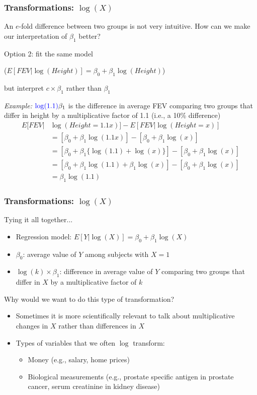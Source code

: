 \documentclass[12pt, 
hyperref={colorlinks=true, linkcolor=blue, urlcolor=cyan},dvipsnames]{beamer}
\begin{document}
\begin{frame}
\frametitle{Transformations: $\log(X)$}
An $e$-fold difference between two groups is not very intuitive. How can we make our interpretation of $\beta_1$ better?

Option 2: fit the same model \begin{scriptsize}($E[FEV|\log(Height)] = \beta_0 + \beta_1\log(Height)$)\end{scriptsize} but interpret $c \times \beta_1$ rather than $\beta_1$ \pause

\textit{Example:} $\color{blue}\log(1.1)\color{black}\beta_1$ is the difference in average FEV comparing two groups that differ in height by a \color{blue}multiplicative factor of 1.1 \color{black} (i.e., a 10\% difference)\pause
	\begin{align*}
	E[FEV|&\log(Height=1.1x)]-E[FEV|\log(Height=x)] \\
	& = \left[\beta_0 + \beta_1\log(1.1x)\right] - \left[\beta_0 + \beta_1 \log(x) \right]\\
	& = \left[\beta_0 + \beta_1\{\log(1.1)+\log(x)\}\right] - \left[\beta_0 + \beta_1 \log(x) \right]\\
	& = \left[\beta_0 + \beta_1\log(1.1)+\beta_1\log(x)\right]-\left[\beta_0 + \beta_1 \log(x) \right]\\
	& = \beta_1\log(1.1)
	\end{align*}
\end{frame}

\begin{frame}
\frametitle{Transformations: $\log(X)$}
Tying it all together...
\begin{itemize}
\item \color{blue} Regression model: \color{black} $E[Y|\log(X)] = \beta_0 + \beta_1\log(X)$
\item \color{blue} $\beta_0$: \color{black} average value of $Y$ among subjects with $X = 1$
\item \color{blue} $\log(k)\times\beta_1$: \color{black} difference in average value of $Y$ comparing two groups that differ in $X$ by a multiplicative factor of $k$
\end{itemize}\pause

Why would we want to do this type of transformation?
\begin{itemize}
\item Sometimes it is more scientifically relevant to talk about multiplicative changes in $X$ rather than differences in $X$
\item Types of variables that we often $\log$ transform:
	\begin{itemize}
	\item Money (e.g., salary, home prices)
	\item Biological measurements (e.g., prostate specific antigen in prostate cancer, serum creatinine in kidney disease)
	\end{itemize}
\end{itemize}
\end{frame}
\end{document}
